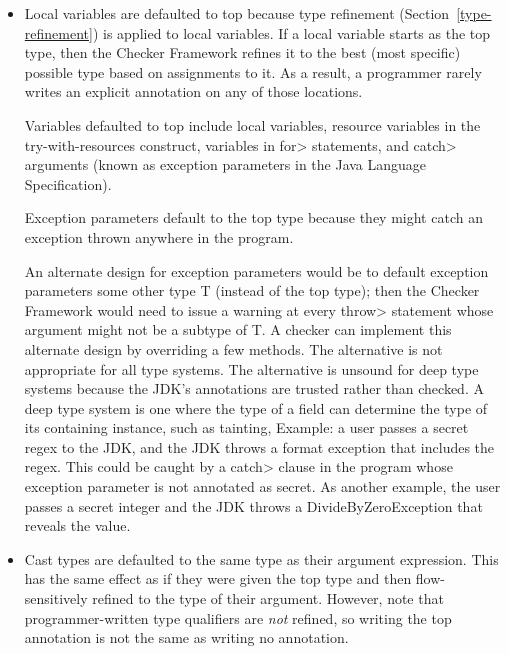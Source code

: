 \begin{itemize}
\item
Local variables are defaulted to top because type refinement
(Section~\ref{type-refinement}) is applied to local variables.  If a local
variable starts as the top type, then the Checker Framework refines it to
the best (most specific) possible type based on assignments to it.  As a
result, a programmer rarely writes an explicit annotation on any of those
locations.

Variables defaulted to top include local variables, resource variables in the
try-with-resources construct, variables in \<for> statements, and \<catch>
arguments (known as exception parameters in the Java Language Specification).

Exception parameters default to the top type because they might catch an
exception thrown anywhere in the program.

An alternate design for exception parameters would be to default exception
parameters some other type T (instead of the top type); then the Checker
Framework would need to issue a warning at every \<throw> statement whose
argument might not be a subtype of T\@.  A checker can implement this
alternate design by overriding a few methods.  The alternative is not
appropriate for all type systems.  The alternative is unsound for deep type
systems because the JDK's annotations are trusted rather than checked.  A
deep type system is one where the type of a field can determine the type of
its containing instance, such as tainting, Example: a user passes a secret
regex to the JDK, and the JDK throws a format exception that includes the
regex.  This could be caught by a \<catch> clause in the program whose
exception parameter is not annotated as secret.  As another example, the
user passes a secret integer and the JDK throws a DivideByZeroException
that reveals the value.


\item
Cast types are defaulted to the same type as their argument expression.
This has the same effect as if they were given the
top type and then flow-sensitively refined to the type of their argument.
However, note that programmer-written type qualifiers are \emph{not}
refined, so writing the top annotation is not the same as writing no annotation.


\end{itemize}
